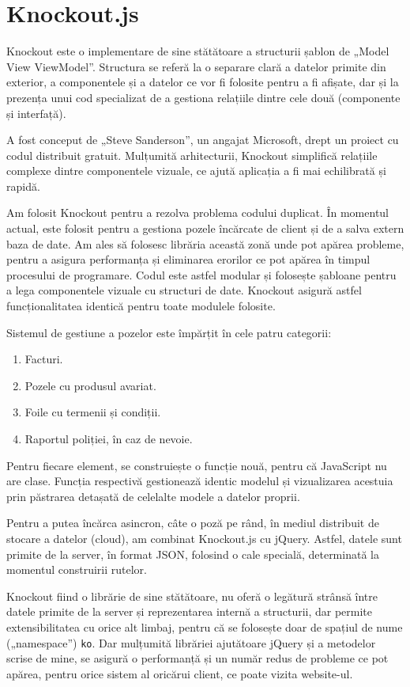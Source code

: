 \section{Knockout.js}

	Knockout este o implementare de sine stătătoare a structurii șablon de „Model View ViewModel”.
	Structura se referă la o separare clară a datelor primite din exterior, a componentele și a datelor ce vor fi folosite pentru a fi afișate, dar și la prezența unui cod specializat de a gestiona relațiile dintre cele două (componente și interfață). \cite{knockout_js}

	A fost conceput de „Steve Sanderson”, un angajat Microsoft, drept un proiect cu codul distribuit gratuit. \cite{knockout_js_site}
	Mulțumită arhitecturii, Knockout simplifică relațiile complexe dintre componentele vizuale, ce ajută aplicația a fi mai echilibrată și rapidă.

	Am folosit Knockout pentru a rezolva problema codului duplicat.
	În momentul actual, este folosit pentru a gestiona pozele încărcate de client și de a salva extern baza de date.
	Am ales să folosesc librăria această zonă unde pot apărea probleme, pentru a asigura performanța și eliminarea erorilor ce pot apărea în timpul procesului de programare.
	Codul este astfel modular și folosește șabloane pentru a lega componentele vizuale cu structuri de date.
	Knockout asigură astfel funcționalitatea identică pentru toate modulele folosite.

	Sistemul de gestiune a pozelor este împărțit în cele patru categorii:
	\begin{enumerate}
		\item Facturi.
		\item Pozele cu produsul avariat.
		\item Foile cu termenii și condiții.
		\item Raportul poliției, în caz de nevoie.
	\end{enumerate}
	Pentru fiecare element, se construiește o funcție nouă, pentru că JavaScript nu are clase.
	Funcția respectivă gestionează identic modelul și vizualizarea acestuia prin păstrarea detașată de celelalte modele a datelor proprii.

	Pentru a putea încărca asincron, câte o poză pe rând, în mediul distribuit de stocare a datelor (cloud), am combinat Knockout.js cu jQuery.
	Astfel, datele sunt primite de la server, în format JSON, folosind o cale specială, determinată la momentul construirii rutelor.

	Knockout fiind o librărie de sine stătătoare, nu oferă o legătură strânsă între datele primite de la server și reprezentarea internă a structurii, dar permite extensibilitatea cu orice alt limbaj, pentru că se folosește doar de spațiul de nume („namespace”) \verb|ko|.
	Dar mulțumită librăriei ajutătoare jQuery și a metodelor scrise de mine, se asigură o performanță și un număr redus de probleme ce pot apărea, pentru orice sistem al oricărui client, ce poate vizita website-ul.

